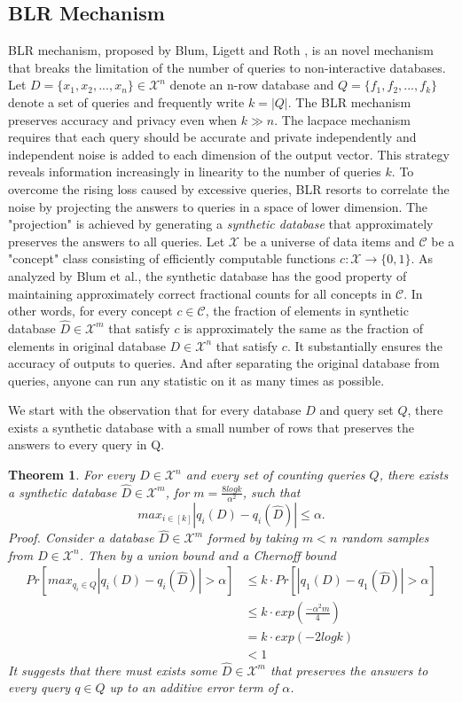 \documentclass[a4paper, 11pt]{article} %
\makeatletter
\DeclareRobustCommand{\etal}{et al.\@\xspace}
\newtheorem{theorem}{Theorem}
\makeatother
\begin{document}
\subsection{BLR Mechanism}
BLR mechanism, proposed by Blum, Ligett and Roth \cite{blum2013learning}, is an novel mechanism that breaks the limitation of the number of queries to non-interactive databases. Let $D = \{x_1, x_2, ..., x_n\} \in \mathcal{X}^n$ denote an n-row database and $Q=\{f_1, f_2, ..., f_k\}$ denote a set of queries and frequently write $k=|Q|$. The BLR mechanism preserves accuracy and privacy even when $k \gg n$. The lacpace mechanism requires that each query should be accurate and private independently and independent noise is added to each dimension of the output vector. This strategy reveals information increasingly in linearity to the number of queries $k$. To overcome the rising loss caused by excessive queries, BLR resorts to correlate the noise by projecting the answers to queries in a space of lower dimension. The "projection" is achieved by generating a \textit{synthetic database} that approximately preserves the answers to all queries. Let $\mathcal{X}$ be a universe of data items and $\mathcal{C}$ be a "concept" class consisting of efficiently computable functions $c: \mathcal{X} \rightarrow \{ 0, 1\}$. As analyzed by Blum \etal \cite{blum2013learning}, the synthetic database has the good property of maintaining approximately correct fractional counts for all concepts in $\mathcal{C}$. In other words, for every concept $c \in \mathcal{C}$, the fraction of elements in synthetic database $\hat{D} \in \mathcal{X}^m$ that satisfy $c$ is approximately the same as the fraction of elements in original database $D \in \mathcal{X}^n$ that satisfy $c$. It substantially ensures the accuracy of outputs to queries. And after separating the original database from queries, anyone can run any statistic on it as many times as possible.

We start with the observation that for every database $D$ and query set $Q$, there exists a synthetic database with a small number of rows that preserves the answers to every query in Q.

\begin{theorem}
\textit{
For every $D \in \mathcal{X}^n$ and every set of counting queries $Q$, there exists a synthetic database $\hat{D} \in \mathcal{X}^m$, for $m = \frac{8logk}{\alpha^2}$, such that
$$ max_{i \in [k]} | q_i(D) - q_i(\hat{D}) | \leq \alpha. $$
Proof. Consider a database $\hat{D}\in \mathcal{X}^m$ formed by taking $m < n$ random samples from $D \in \mathcal{X}^n$. Then by a union bound and a Chernoff bound
\begin{align}
Pr\left[ max_{q_i \in Q} | q_i(D) - q_i(\hat{D})   | > \alpha \right]
&\leq  k \cdot Pr \left[ | q_1(D) - q_1(\hat{D})   |  > \alpha  \right] \\
& \leq k \cdot exp\left( \frac{-\alpha^2 m}{4} \right) \\
&= k \cdot exp(-2logk) \\
& < 1
\end{align}
}
It suggests that there must exists some $\hat{D} \in \mathcal{X}^m$ that preserves the answers to every query $q \in Q$ up to an additive error term of $\alpha$.
\end{theorem}
\end{document}
